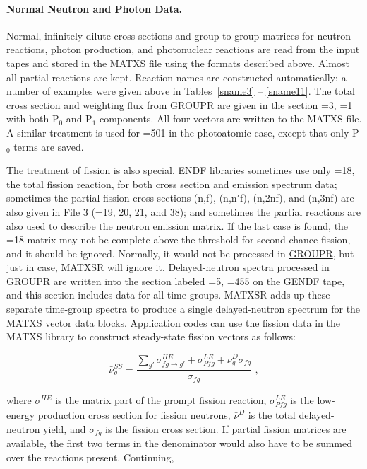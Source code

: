 \paragraph{Normal Neutron and Photon Data.}
Normal, infinitely dilute cross sections and group-to-group matrices
for neutron reactions, photon production, and photonuclear reactions
are read from the input tapes and stored in the MATXS file using the
formats described above.  Almost all partial reactions are kept.
Reaction names are constructed automatically; a number of examples were
given above in Tables~\ref{sname3} -- \ref{sname11}.  The total cross
section and weighting flux from
\hyperlink{sGROUPRhy}{GROUPR} are given in the section =3,
=1 with both P$_0$ and P$_1$ components.  All four vectors are
written to the MATXS file.  A similar treatment is used for =501
in the photoatomic case, except that only P$_0$ terms are saved.

The treatment of fission is also special.  ENDF libraries sometimes
use only =18, the total fission reaction, for both cross section and
emission spectrum data; sometimes the partial fission cross sections
(n,f), (n,n$'$f), (n,2nf), and (n,3nf) are also given in File 3
(=19, 20, 21, and 38); and sometimes the partial reactions are also
used to describe the neutron emission matrix.  If the last case is found,
the =18 matrix may not  be complete above the threshold for
second-chance fission, and it should be ignored.  Normally, it would
not be processed in
\hyperlink{sGROUPRhy}{GROUPR}, but just in case, MATXSR will ignore it.
Delayed-neutron spectra processed in
\hyperlink{sGROUPRhy}{GROUPR} are written into the section
labeled =5, =455 on the GENDF tape, and this
section includes data
for all time groups.  MATXSR
adds up these separate time-group spectra
to produce a single delayed-neutron spectrum for the MATXS vector data
blocks.  Application codes can use the fission data in the MATXS library
to construct steady-state fission vectors as follows:

\begin{equation}
   \bar{\nu}^{SS}_g=\frac{\displaystyle\sum_{g'}\sigma^{HE}_{fg{\rightarrow}g'}
     +\sigma^{LE}_{Pfg} + \bar{\nu}^D_g\sigma_{fg}}
     {\sigma_{fg}} \,\,,
\end{equation}
\vspace{0.5 pt}

\noindent
where $\sigma^{HE}$ is the matrix part of the prompt fission reaction,
$\sigma^{LE}_{Pfg}$ is the low-energy production cross section for
fission neutrons, $\bar{\nu}^D$ is the total delayed-neutron yield,
and $\sigma_{fg}$ is the fission cross section.  If partial fission
matrices are available, the first two terms in the denominator
would also have to be summed over the reactions present. Continuing,

